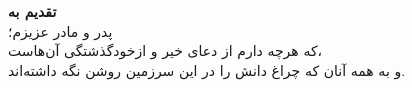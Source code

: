 \thispagestyle{empty}
\begin{singlespace}
\vspace*{\fill}
\begin{center}
{\Large\bfseries تقدیم به}\\[6mm]
{\large پدر و مادر عزیزم؛\\[2mm]
که هرچه دارم از دعای خیر و ازخودگذشتگی آن‌هاست،\\[2mm]
و به همه آنان که چراغ دانش را در این سرزمین روشن نگه داشته‌اند.}
\end{center}
\vspace*{\fill}
\end{singlespace}
\clearpage
